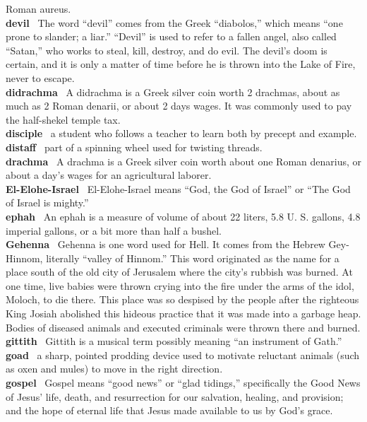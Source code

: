 Roman aureus.\\
\textbf{devil}~ The word ``devil'' comes from the Greek ``diabolos,''
which means ``one prone to slander; a liar.'' ``Devil'' is used to refer
to a fallen angel, also called ``Satan,'' who works to steal, kill,
destroy, and do evil. The devil's doom is certain, and it is only a
matter of time before he is thrown into the Lake of Fire, never to
escape.\\
\textbf{didrachma}~ A didrachma is a Greek silver coin worth 2 drachmas,
about as much as 2 Roman denarii, or about 2 days wages. It was commonly
used to pay the half-shekel temple tax.\\
\textbf{disciple}~ a student who follows a teacher to learn both by
precept and example.\\
\textbf{distaff}~ part of a spinning wheel used for twisting threads.\\
\textbf{drachma}~ A drachma is a Greek silver coin worth about one Roman
denarius, or about a day's wages for an agricultural laborer.\\
\textbf{El-Elohe-Israel}~ El-Elohe-Israel means ``God, the God of
Israel'' or ``The God of Israel is mighty.''\\
\textbf{ephah}~ An ephah is a measure of volume of about 22 liters, 5.8
U. S. gallons, 4.8 imperial gallons, or a bit more than half a bushel.\\
\textbf{Gehenna}~ Gehenna is one word used for Hell. It comes from the
Hebrew Gey-Hinnom, literally ``valley of Hinnom.'' This word originated
as the name for a place south of the old city of Jerusalem where the
city's rubbish was burned. At one time, live babies were thrown crying
into the fire under the arms of the idol, Moloch, to die there. This
place was so despised by the people after the righteous King Josiah
abolished this hideous practice that it was made into a garbage heap.
Bodies of diseased animals and executed criminals were thrown there and
burned.\\
\textbf{gittith}~ Gittith is a musical term possibly meaning ``an
instrument of Gath.''\\
\textbf{goad}~ a sharp, pointed prodding device used to motivate
reluctant animals (such as oxen and mules) to move in the right
direction.\\
\textbf{gospel}~ Gospel means ``good news'' or ``glad tidings,''
specifically the Good News of Jesus' life, death, and resurrection for
our salvation, healing, and provision; and the hope of eternal life that
Jesus made available to us by God's grace.\\
